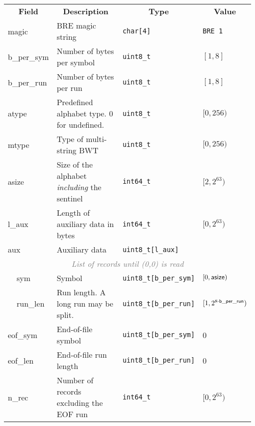 \documentclass[10pt]{article}
\begin{document}
\begin{table}[ht]
\centering
{\small
\begin{tabular}{|l|l|p{7cm}|l|l|}
  \cline{1-5}
  \multicolumn{2}{|c|}{\bf Field} & \multicolumn{1}{c|}{\bf Description} & \multicolumn{1}{c|}{\bf Type} & \multicolumn{1}{c|}{\bf Value} \\\cline{1-5}
  \multicolumn{2}{|l|}{\sf magic} & BRE magic string & {\tt char[4]} & {\tt BRE\char92 1}\\\cline{1-5}
  \multicolumn{2}{|l|}{\sf b\_per\_sym} & Number of bytes per symbol & {\tt uint8\_t} & $[1,8]$ \\\cline{1-5}
  \multicolumn{2}{|l|}{\sf b\_per\_run} & Number of bytes per run & {\tt uint8\_t} & $[1,8]$ \\\cline{1-5}
  \multicolumn{2}{|l|}{\sf atype} & Predefined alphabet type. 0 for undefined. & {\tt uint8\_t} & $[0,256)$ \\\cline{1-5}
  \multicolumn{2}{|l|}{\sf mtype} & Type of multi-string BWT & {\tt uint8\_t} & $[0,256)$ \\\cline{1-5}
  \multicolumn{2}{|l|}{\sf asize} & Size of the alphabet \emph{including} the sentinel & {\tt int64\_t} & $[2,2^{63})$ \\\cline{1-5}
  \multicolumn{2}{|l|}{\sf l\_aux} & Length of auxiliary data in bytes & {\tt int64\_t} & $[0,2^{63})$ \\\cline{1-5}
  \multicolumn{2}{|l|}{\sf aux} & Auxiliary data & {\tt uint8\_t[l\_aux]} & \\\cline{1-5}
  \multicolumn{5}{|c|}{\textcolor{gray}{\it List of records until (0,0) is read}} \\\cline{2-5}
  & {\sf sym} & Symbol & {\tt uint8\_t[b\_per\_sym]} & $[0,{\sf asize})$ \\\cline{2-5}
  & {\sf run\_len} & Run length. A long run may be split. & {\tt uint8\_t[b\_per\_run]} & $[1,2^{8\cdot{\sf b\_per\_run}})$ \\\cline{1-5}
  \multicolumn{2}{|l|}{\sf eof\_sym} & End-of-file symbol & {\tt uint8\_t[b\_per\_sym]} & 0 \\\cline{1-5}
  \multicolumn{2}{|l|}{\sf eof\_len} & End-of-file run length & {\tt uint8\_t[b\_per\_run]} & 0 \\\cline{1-5}
  \multicolumn{2}{|l|}{\sf n\_rec} & Number of records excluding the EOF run & {\tt int64\_t} & $[0,2^{63})$ \\\cline{1-5}
\end{tabular}}
\end{table}
\end{document}
